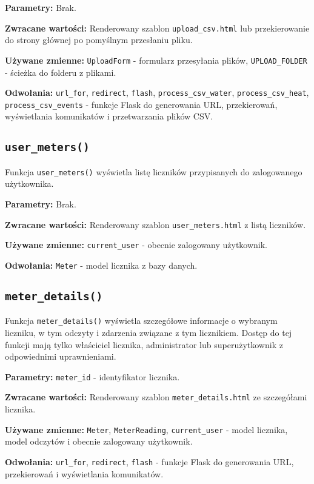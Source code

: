 \documentclass[12pt,a4paper]{report}
\begin{document}
\textbf{Parametry:} Brak.

\textbf{Zwracane wartości:} Renderowany szablon \texttt{upload\_csv.html} lub przekierowanie do strony głównej po pomyślnym przesłaniu pliku.

\textbf{Używane zmienne:} \texttt{UploadForm} - formularz przesyłania plików, \texttt{UPLOAD\_FOLDER} - ścieżka do folderu z plikami.

\textbf{Odwołania:} \texttt{url\_for}, \texttt{redirect}, \texttt{flash}, \texttt{process\_csv\_water}, \texttt{process\_csv\_heat}, \texttt{process\_csv\_events} - funkcje Flask do generowania URL, przekierowań, wyświetlania komunikatów i przetwarzania plików CSV.

\subsection{\texttt{user\_meters()}}
\label{sec:user_meters}
Funkcja \texttt{user\_meters()} wyświetla listę liczników przypisanych do zalogowanego użytkownika.

\textbf{Parametry:} Brak.

\textbf{Zwracane wartości:} Renderowany szablon \texttt{user\_meters.html} z listą liczników.

\textbf{Używane zmienne:} \texttt{current\_user} - obecnie zalogowany użytkownik.

\textbf{Odwołania:} \texttt{Meter} - model licznika z bazy danych.

\subsection{\texttt{meter\_details()}}
\label{sec:meter_details}
Funkcja \texttt{meter\_details()} wyświetla szczegółowe informacje o wybranym liczniku, w tym odczyty i zdarzenia związane z tym licznikiem. Dostęp do tej funkcji mają tylko właściciel licznika, administrator lub superużytkownik z odpowiednimi uprawnieniami.

\textbf{Parametry:} \texttt{meter\_id} - identyfikator licznika.

\textbf{Zwracane wartości:} Renderowany szablon \texttt{meter\_details.html} ze szczegółami licznika.

\textbf{Używane zmienne:} \texttt{Meter}, \texttt{MeterReading}, \texttt{current\_user} - model licznika, model odczytów i obecnie zalogowany użytkownik.

\textbf{Odwołania:} \texttt{url\_for}, \texttt{redirect}, \texttt{flash} - funkcje Flask do generowania URL, przekierowań i wyświetlania komunikatów.
\end{document}
